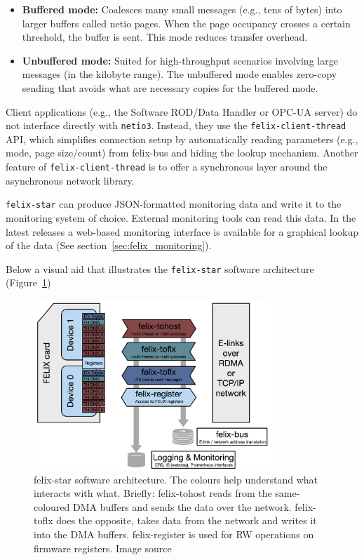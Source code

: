 \begin{itemize}
    \item \textbf{Buffered mode:} Coalesces many small messages (e.g., tens of bytes) into larger buffers called netio pages. When the page occupancy crosses a certain threshold, the buffer is sent. This mode reduces transfer overhead.
    \item \textbf{Unbuffered mode:} Suited for high-throughput scenarios involving large messages (in the kilobyte range). The unbuffered mode enables zero-copy sending that avoids what are necessary copies for the buffered mode.
\end{itemize}

Client applications (e.g., the Software ROD/Data Handler \cite{swrod-repository} or \acs{OPC-UA} \cite{opc-ua} server) do not interface directly with \texttt{netio3}. Instead, they use the \texttt{felix-client-thread} \acs{API}, which simplifies connection setup by automatically reading parameters (e.g., mode, page size/count) from felix-bus and hiding the lookup mechanism. Another feature of \texttt{felix-client-thread} is to offer a synchronous layer around the asynchronous network library.

\texttt{felix-star} can produce JSON-formatted monitoring data and write it to the monitoring system of choice. External monitoring tools can read this data. In the latest releases a web-based monitoring interface is available for a graphical lookup of the data (See section~\ref{sec:felix_monitoring}).

Below a visual aid that illustrates the \texttt{felix-star} software architecture (Figure~\ref{fig:felix-star})

\begin{figure}[htbp]
\centering
\includegraphics[width=0.8\textwidth]{images/felix/felix-star-architecture.png}
\caption[felix-star software architecture]{felix-star software architecture. The colours help understand what interacts with what. Briefly: felix-tohost reads from the same-coloured DMA buffers and sends the data over the network. felix-toflx does the opposite, takes data from the network and writes it into the DMA buffers. felix-register is used for RW operations on firmware registers. Image source \cite{felix-user-manual}}
\label{fig:felix-star}
\end{figure}

